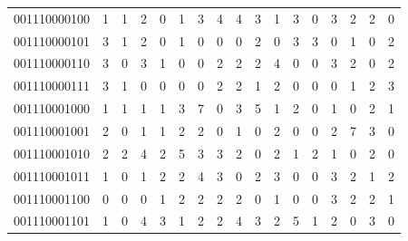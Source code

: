\documentclass[10pt,a4paper]{article}
\begin{document}
\begin{longtable}{ |c|c|c|c|c|c|c|c|c|c|c|c|c|c|c|c|c| }
    001110000100              & 1                            & 1                                & 2                            & 0                              & 1   & 3   & 4   & 4   & 3   & 1   & 3   & 0   & 3   & 2   & 2   & 0   \\
    001110000101              & 3                            & 1                                & 2                            & 0                              & 1   & 0   & 0   & 0   & 2   & 0   & 3   & 3   & 0   & 1   & 0   & 2   \\
    001110000110              & 3                            & 0                                & 3                            & 1                              & 0   & 0   & 2   & 2   & 2   & 4   & 0   & 0   & 3   & 2   & 0   & 2   \\
    001110000111              & 3                            & 1                                & 0                            & 0                              & 0   & 0   & 2   & 2   & 1   & 2   & 0   & 0   & 0   & 1   & 2   & 3   \\
    001110001000              & 1                            & 1                                & 1                            & 1                              & 3   & 7   & 0   & 3   & 5   & 1   & 2   & 0   & 1   & 0   & 2   & 1   \\
    001110001001              & 2                            & 0                                & 1                            & 1                              & 2   & 2   & 0   & 1   & 0   & 2   & 0   & 0   & 2   & 7   & 3   & 0   \\
    001110001010              & 2                            & 2                                & 4                            & 2                              & 5   & 3   & 3   & 2   & 0   & 2   & 1   & 2   & 1   & 0   & 2   & 0   \\
    001110001011              & 1                            & 0                                & 1                            & 2                              & 2   & 4   & 3   & 0   & 2   & 3   & 0   & 0   & 3   & 2   & 1   & 2   \\
    001110001100              & 0                            & 0                                & 0                            & 1                              & 2   & 2   & 2   & 2   & 0   & 1   & 0   & 0   & 3   & 2   & 2   & 1   \\
    001110001101              & 1                            & 0                                & 4                            & 3                              & 1   & 2   & 2   & 4   & 3   & 2   & 5   & 1   & 2   & 0   & 3   & 0   \\

\end{longtable}
\end{document}
